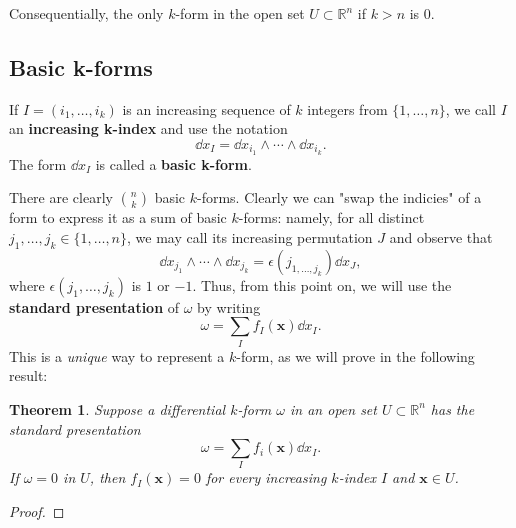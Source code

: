 \documentclass[11pt]{article}
\newtheorem{theorem}{Theorem}
\renewcommand{\vec}[1]{\mathbf{#1}}
\begin{document}

Consequentially, the only $k$-form in the open set $U \subset \mathbb{R}^{n}$ if $k > n$ is $0$.


\subsection{Basic k-forms}

If $I = (i_{1}, \ldots, i_{k})$ is an increasing sequence of $k$ integers from $\{ 1, \ldots, n \}$, we call $I$ an \textbf{increasing k-index} and use the notation
\[
	\dd{x_{I}} = \dd{x_{i_{1}}} \wedge \cdots \wedge \dd{x_{i_{k}}}.
\]
The form $\dd{x_{I}}$ is called a \textbf{basic k-form}.

There are clearly $\binom{n}{k}$ basic $k$-forms. Clearly we can "swap the indicies" of a form to express it as a sum of basic $k$-forms: namely, for all distinct $j_{1}, \ldots, j_{k} \in \{ 1, \ldots, n \}$, we may call its increasing permutation $J$ and observe that
\[
	\dd{x_{j_{1}}} \wedge \cdots \wedge \dd{x_{j_{k}}} = \epsilon(j_{1, \ldots, j_{k}}) \dd{x_{J}},
\]
where $\epsilon(j_{1}, \ldots, j_{k})$ is $1$ or $-1$. Thus, from this point on, we will use the \textbf{standard presentation} of $\omega$ by writing
\[
	\omega = \sum_{I} f_{I}(\vec{x}) \dd{x_{I}}.
\]
This is a \textit{unique} way to represent a $k$-form, as we will prove in the following result:

\begin{theorem}
	Suppose a differential $k$-form $\omega$ in an open set $U \subset \mathbb{R}^{n}$ has the standard presentation
	\[
		\omega = \sum_{I} f_{i}(\vec{x}) \dd{x_{I}}.
	\]	
	If $\omega = 0$ in $U$, then $f_{I}(\vec{x}) = 0$ for every increasing $k$-index $I$ and $\vec{x} \in U$.
\end{theorem}
\begin{adjustwidth}{1cm}{}
    \begin{proof}\renewcommand{\qedsymbol}{}
		
	\end{proof}
\end{adjustwidth}
\end{document}
